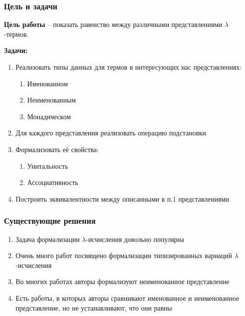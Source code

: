 \documentclass{beamer}
\begin{document}
\begin{frame}\frametitle{Цель и задачи}
    \textbf{Цель работы} -- показать равенство между различными представлениями $\lambda$-термов.

    \bigskip

    \textbf{Задачи:}
    \begin{enumerate}
        \item Реализовать типы данных для термов в интересующих нас представлениях:
          \begin{enumerate}
            \item Именованном
            \item Неименованным
            \item Монадическом
          \end{enumerate}
        \item Для каждого представления реализовать операцию подстановки
        \item Формализовать её свойства:
          \begin{enumerate}
            \item Унитальность
            \item Ассоциативность
          \end{enumerate}
        \item Построить эквивалентности между описанными в п.1 представлениями
    \end{enumerate}
\end{frame}


\begin{frame}\frametitle{Существующие решения}
    \begin{enumerate}
        \item Задача формализации $\lambda$-исчисления довольно популярна
        \item Очень много работ посвящено формализации типизированных вариаций $\lambda$-исчисления
        \item Во многих работах авторы формализуют неименованное представление
        \item Есть работы, в которых авторы сравнивают именованное и неименованное представление, но не устанавливают, что они равны
    \end{enumerate}
\end{frame}
\end{document}
